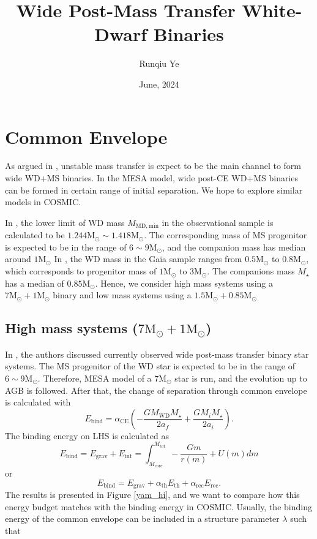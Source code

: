 \documentclass[12pt]{article}
\title{Wide Post-Mass Transfer White-Dwarf Binaries}
\author{Runqiu Ye}
\date{June, 2024}
\newcommand{\Msun}{\mathrm{M_{\odot}}}
\newcommand{\MWD}{M_{\mathrm{WD}}}
\newcommand{\Mstar}{M_{\star}}
\newcommand{\alphace}{\alpha_{\mathrm{CE}}}
\newcommand{\alphath}{\alpha_{\mathrm{th}}}
\newcommand{\alpharec}{\alpha_{\mathrm{rec}}}
\begin{document}
\maketitle

\section{Common Envelope}

As argued in \cite{yamaguchi_hi,yamaguchi_lo}, unstable mass transfer is expect to be the main channel to form wide WD+MS binaries. In the MESA model, wide post-CE WD+MS binaries can be formed in certain range of initial separation. We hope to explore similar models in COSMIC.

In \cite{yamaguchi_hi}, the lower limit of WD mass $M_{\mathrm{MD, min}}$ in the observational sample is calculated to be $1.244\Msun \sim 1.418\Msun$. The corresponding mass of MS progenitor is expected to be in the range of $6 \sim 9 \Msun$, and the companion mass has median around $1\Msun$ In \cite{yamaguchi_lo}, the WD mass in the Gaia sample ranges from $0.5\Msun$ to $0.8\Msun$, which corresponds to progenitor mass of $1 \Msun$ to $3 \Msun$. The companions mass $\Mstar$ has a median of $0.85 \Msun$. Hence, we consider high mass systems using a $7\Msun + 1\Msun$ binary and low mass systems using a $1.5\Msun + 0.85\Msun$

\subsection{High mass systems ($7\Msun + 1\Msun$)}
In \cite{yamaguchi_hi}, the authors discussed currently observed wide post-mass transfer binary star systems. The MS progenitor of the WD star is expected to be in the range of $6 \sim 9 \Msun$. Therefore, MESA model of a $7\Msun$ star is run, and the evolution up to AGB is followed. After that, the change of separation through common envelope is calculated with
\[
E_{\mathrm{bind}} = \alphace \left(-\frac{G\MWD \Mstar}{2a_f}+\frac{GM_i \Mstar}{2a_i}\right).
\]
The binding energy on LHS is calculated as
\[
E_{\mathrm{bind}} = E_{\mathrm{grav}} + E_{\mathrm{int}} = \int_{M_{\mathrm{core}}}^{M_{\mathrm{tot}}} -\frac{Gm}{r(m)} + U(m) dm
\]
or
\[
	E_{\mathrm{bind}} = E_{\mathrm{grav}} + \alphath E_{\mathrm{th}} + \alpharec E_{\mathrm{rec}}.
\]
The results is presented in Figure \ref{yam_hi}, and we want to compare how this energy budget matches with the binding energy in COSMIC. Usually, the binding energy of the common envelope can be included in a structure parameter $\lambda$ such that 
\end{document}
